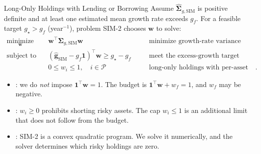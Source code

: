 \documentclass[aspectratio=169,11pt]{beamer}
\newcommand{\bg}{\mathbf{g}}
\newcommand{\bw}{\mathbf{w}}
\newcommand{\bone}{\mathbf{1}}
\newcommand{\SigSIM}{\hat{\symbf{\Sigma}}_{g,\mathrm{SIM}}}
\newcommand{\gSIM}{\hat{\bg}_{\mathrm{SIM}}}
\begin{document}
\begin{frame}{Long-Only Holdings with Lending or Borrowing}
  Assume $\SigSIM$ is positive definite and at least one estimated mean growth rate exceeds
  $g_f$. For a feasible target $g_\star>g_f$ (year$^{-1}$), problem SIM-2 chooses $\bw$ to solve:
  \[
    \boxed{
    \begin{aligned}
      \underset{\bw}{\text{minimize}}\quad &\bw^{\top}\SigSIM\bw
        &&\quad\text{minimize growth-rate variance}\\
      \text{subject to}\quad
        &(\gSIM-g_f\bone)^{\top}\bw\ge g_\star-g_f
        &&\quad\text{meet the excess-growth target}\\
      &0\le w_i\le1,\quad i\in\mathcal P
        &&\quad\text{long-only holdings with per-asset caps}.
    \end{aligned}}
  \]
  \begin{itemize}\setlength{\itemsep}{0.4em}
    \item {}: we do \emph{not} impose $\bone^{\top}\bw=1$. The budget is
      $\bone^{\top}\bw+w_f=1$, and $w_f$ may be negative.
    \item {}: $w_i\ge0$ prohibits shorting risky assets. The cap $w_i\le1$ is an
      additional limit that does not follow from the budget.
    \item {}: SIM-2 is a convex quadratic program. We solve it numerically,
      and the solver determines which risky holdings are zero.
  \end{itemize}
\end{frame}
\end{document}
